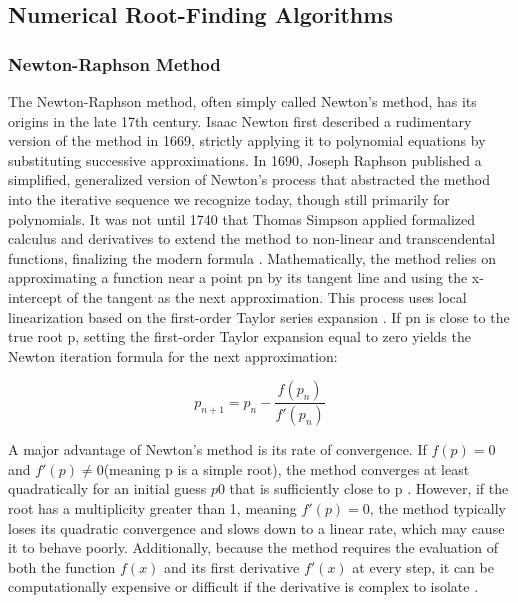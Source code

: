 \documentclass[a4paper,11pt]{article}
\begin{document}
\subsection{Numerical Root-Finding Algorithms}

\subsubsection{Newton-Raphson Method}

The Newton-Raphson method, often simply called Newton's method, has its origins in the late 17th century. Isaac Newton first described a rudimentary version of the method in 1669, strictly applying it to polynomial equations by substituting successive approximations. In 1690, Joseph Raphson published a simplified, generalized version of Newton's process that abstracted the method into the iterative sequence we recognize today, though still primarily for polynomials. It was not until 1740 that Thomas Simpson applied formalized calculus and derivatives to extend the method to non-linear and transcendental functions, finalizing the modern formula \parencite{ypma1995historical}. Mathematically, the method relies on approximating a function near a point pn by its tangent line and using the x-intercept of the tangent as the next approximation. This process uses local linearization based on the first-order Taylor series expansion \parencite{burden2016numerical}. If pn is close to the true root p, setting the first-order Taylor expansion equal to zero yields the Newton iteration formula for the next approximation:

\begin{equation*}
    p_{n+1} = p_n - \frac{f(p_n)}{f'(p_n)}
\end{equation*}

A major advantage of Newton's method is its rate of convergence. If $f(p) = 0$ and $f'(p) \neq 0 $(meaning p is a simple root), the method converges at least quadratically for an initial guess $p0$ that is sufficiently close to p \parencite{burden2016numerical}. However, if the root has a multiplicity greater than 1, meaning $f'(p) = 0$, the method typically loses its quadratic convergence and slows down to a linear rate, which may cause it to behave poorly. Additionally, because the method requires the evaluation of both the function $f(x)$ and its first derivative $f'(x)$ at every step, it can be computationally expensive or difficult if the derivative is complex to isolate \parencite{burden2016numerical}.
\end{document}
